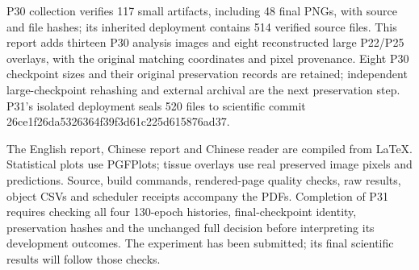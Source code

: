 \documentclass[
  11pt,
]{article}
\begin{document}
P30 collection verifies 117 small artifacts, including 48 final PNGs,
with source and file hashes; its inherited deployment contains 514
verified source files. This report adds thirteen P30 analysis images and
eight reconstructed large P22/P25 overlays, with the original matching
coordinates and pixel provenance. Eight P30 checkpoint sizes and their
original preservation records are retained; independent large-checkpoint
rehashing and external archival are the next preservation step. P31's
isolated deployment seals 520 files to scientific commit
26ce1f26da5326364f39f3d61c225d615876ad37.

The English report, Chinese report and Chinese reader are compiled from
LaTeX. Statistical plots use PGFPlots; tissue overlays use real
preserved image pixels and predictions. Source, build commands,
rendered-page quality checks, raw results, object CSVs and scheduler
receipts accompany the PDFs. Completion of P31 requires checking all
four 130-epoch histories, final-checkpoint identity, preservation hashes
and the unchanged full decision before interpreting its development
outcomes. The experiment has been submitted; its final scientific
results will follow those checks.
\end{document}
